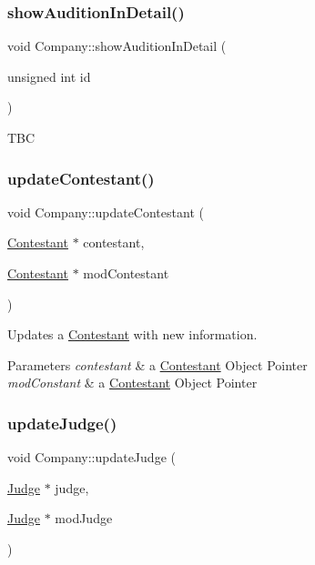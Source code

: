 \subsubsection{\texorpdfstring{show\+Audition\+In\+Detail()}{showAuditionInDetail()}}
{\footnotesize\ttfamily void Company\+::show\+Audition\+In\+Detail (\begin{DoxyParamCaption}\item[{unsigned int}]{id }\end{DoxyParamCaption})}

T\+BC \mbox{\label{class_company_a8948265cd00ed452e5336964ef2b5537}} 
\subsubsection{\texorpdfstring{update\+Contestant()}{updateContestant()}}
{\footnotesize\ttfamily void Company\+::update\+Contestant (\begin{DoxyParamCaption}\item[{\hyperlink{class_contestant}{Contestant} $\ast$}]{contestant,  }\item[{\hyperlink{class_contestant}{Contestant} $\ast$}]{mod\+Contestant }\end{DoxyParamCaption})}



Updates a \hyperlink{class_contestant}{Contestant} with new information. 


\begin{DoxyParams}{Parameters}
{\em contestant} & a \hyperlink{class_contestant}{Contestant} Object Pointer \\
\hline
{\em mod\+Constant} & a \hyperlink{class_contestant}{Contestant} Object Pointer \\
\hline
\end{DoxyParams}
\mbox{\label{class_company_a315bc334167bce6e6836b6462f85e959}} 
\subsubsection{\texorpdfstring{update\+Judge()}{updateJudge()}}
{\footnotesize\ttfamily void Company\+::update\+Judge (\begin{DoxyParamCaption}\item[{\hyperlink{class_judge}{Judge} $\ast$}]{judge,  }\item[{\hyperlink{class_judge}{Judge} $\ast$}]{mod\+Judge }\end{DoxyParamCaption})}



